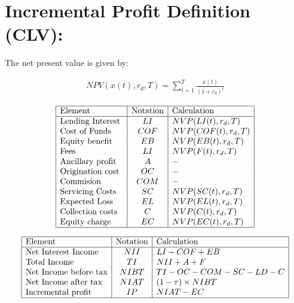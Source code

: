 \section{ Incremental Profit Definition (CLV): }
The net present value is given by:

\begin{align}
NPV(x(t),r_d,T)=\sum_{t=1}^T \frac{x(t)}{(1+r_d)^t}
\end{align}

\renewcommand{\arraystretch}{1.5} %
\begin{center} %
\[ %
\begin{array}{|l|c|l|} \hline %
\mbox{Element} & \mbox{Notation} & \mbox{Calculation}\\ \hline
\mbox{Lending Interest }  & LI & NVP(LI(t),r_d,T)\\
\mbox{Cost of Funds   }  & COF & NVP(COF(t),r_d,T)\\
\mbox{Equity benefit }  & EB & NVP(EB(t),r_d,T)\\
\mbox{Fees }  & LI & NVP(F(t),r_d,T)\\
\mbox{Ancillary profit }  & A & -\\
\mbox{Origination cost}  & OC & -\\
\mbox{Commision  }  & COM & -\\
\mbox{Servicing Costs}  & SC & NVP(SC(t),r_d,T)\\
\mbox{Expected Loss }  & EL & NVP(EL(t),r_d,T)\\
\mbox{Collection costs }  & C & NVP(C(t),r_d,T)\\
\mbox{Equity charge}  & EC & NVP(EC(t),r_d,T)\\

\hline
\end{array} %
\] %
\end{center}

\renewcommand{\arraystretch}{1.5} %
\begin{center} %
\[ %
\begin{array}{|l|c|l|} \hline %
\mbox{Element} & \mbox{Notation} & \mbox{Calculation}\\ \hline
\mbox{Net Interest Income }  & NII & LI-COF+EB\\
\mbox{Total Income  }  & TI & NII+A+F\\
\mbox{Net Income before tax}  & NIBT & TI-OC-COM-SC-LD-C\\
\mbox{Net Income after tax }  & NIAT&(1-\tau)\times NIBT \\
\mbox{Incremental profit  }  & IP & NIAT-EC\\

\hline
\end{array} %
\] %
\end{center}

